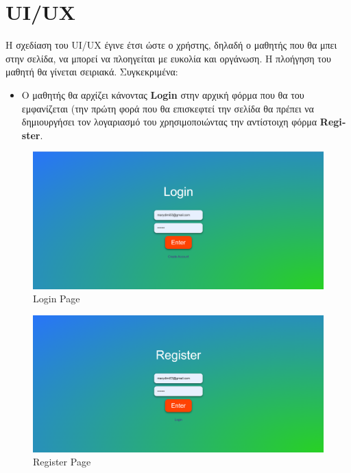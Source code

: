 \section{\textlatin{UI/UX}}
Η σχεδίαση του \textlatin{UI/UX} έγινε έτσι ώστε ο χρήστης, δηλαδή ο μαθητής που θα μπει στην σελίδα, να μπορεί να πλοηγείται με ευκολία και οργάνωση. Η πλοήγηση του μαθητή θα γίνεται σειριακά. Συγκεκριμένα:

\begin{itemize}
    \item Ο μαθητής θα αρχίζει κάνοντας \textbf{\textlatin{Login}} στην αρχική φόρμα που θα του εμφανίζεται (την πρώτη φορά που θα επισκεφτεί την σελίδα θα πρέπει να δημιουργήσει τον λογαριασμό του χρησιμοποιώντας την αντίστοιχη φόρμα \textbf{\textlatin{Register}}.
\end{itemize}
\begin{figure}[H]
        \centering
        \includegraphics[width=1\linewidth]{img/Login.png}
        \caption{\textlatin{Login Page}}
\end{figure}
\begin{figure}[H]
    \centering
    \includegraphics[width=1\linewidth]{img/Register.png}
    \caption{\textlatin{Register Page}}
\end{figure}

\newpage

